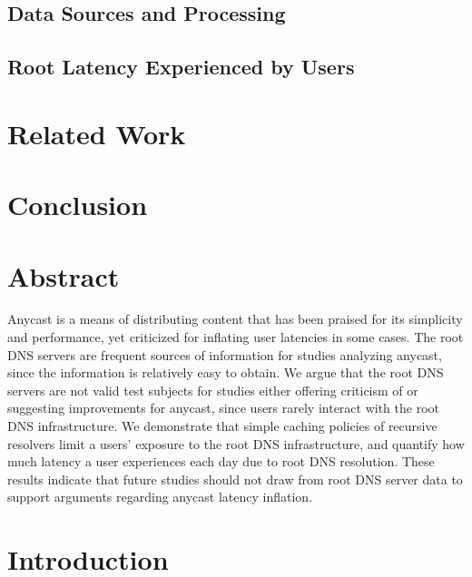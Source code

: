\documentclass[sigconf,nonacm,10pt]{acmart}
\begin{document}
\subsection{Data Sources and
Processing}\label{data-sources-and-processing}

\subsection{Root Latency Experienced by
Users}\label{root-latency-experienced-by-users}

\section{Related Work}\label{related-work}

\section{Conclusion}\label{conclusion}

\fi

\section*{Abstract}\label{abstract-1}

Anycast is a means of distributing content that has been praised for its
simplicity and performance, yet criticized for inflating user latencies
in some cases. The root DNS servers are frequent sources of information
for studies analyzing anycast, since the information is relatively easy
to obtain. We argue that the root DNS servers are not valid test
subjects for studies either offering criticism of or suggesting
improvements for anycast, since users rarely interact with the root DNS
infrastructure. We demonstrate that simple caching policies of recursive
resolvers limit a users' exposure to the root DNS infrastructure, and
quantify how much latency a user experiences each day due to root DNS
resolution. These results indicate that future studies should not draw
from root DNS server data to support arguments regarding anycast latency
inflation.

\section{Introduction}\label{introduction-1}
\end{document}
